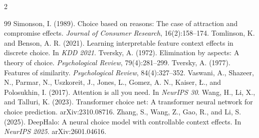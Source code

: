 \documentclass[11pt,a4paper]{article}
\numberwithin{table}{section}
\numberwithin{figure}{section}
\numberwithin{equation}{section}
\begin{document}
\begin{multicols}{2}
\begin{thebibliography}{99}
 Simonson, I. (1989). Choice based on reasons: The case of attraction and compromise effects. \emph{Journal of Consumer Research}, 16(2):158--174.
 Tomlinson, K. and Benson, A. R. (2021). Learning interpretable feature context effects in discrete choice. In \emph{KDD 2021}.
 Tversky, A. (1972). Elimination by aspects: A theory of choice. \emph{Psychological Review}, 79(4):281--299.
 Tversky, A. (1977). Features of similarity. \emph{Psychological Review}, 84(4):327--352.
 Vaswani, A., Shazeer, N., Parmar, N., Uszkoreit, J., Jones, L., Gomez, A. N., Kaiser, {\L}., and Polosukhin, I. (2017). Attention is all you need. In \emph{NeurIPS 30}.
 Wang, H., Li, X., and Talluri, K. (2023). Transformer choice net: A transformer neural network for choice prediction. arXiv:2310.08716.
 Zhang, S., Wang, Z., Gao, R., and Li, S. (2025). DeepHalo: A neural choice model with controllable context effects. In \emph{NeurIPS 2025}. arXiv:2601.04616.
\end{thebibliography}
\end{multicols}
\end{document}
